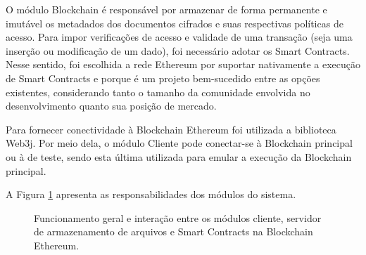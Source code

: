 \documentclass[a4paper,11pt]{article}
\begin{document}
O módulo Blockchain é responsável por armazenar de forma permanente e imutável {\color{blue}os metadados} dos documentos cifrados e suas respectivas políticas de acesso. Para impor verificações de acesso e validade de uma transação (seja uma inserção ou modificação de um dado), foi necessário adotar os Smart Contracts. %
Nesse sentido, foi escolhida a rede Ethereum por suportar nativamente a execução de Smart Contracts e porque é um projeto bem-sucedido entre as opções existentes, considerando tanto o tamanho da comunidade envolvida no desenvolvimento quanto sua posição de mercado. %

Para fornecer conectividade à Blockchain Ethereum foi utilizada a biblioteca Web3j.
Por meio dela, o módulo Cliente pode conectar-se à Blockchain principal ou à de teste, sendo esta última utilizada para emular a execução da Blockchain principal. %


A Figura \ref{fig:diagramaDCPABE} apresenta as responsabilidades dos módulos do sistema.

\begin{figure}[H]
  \centering
  
  \caption{Funcionamento geral e interação entre os módulos cliente, servidor de armazenamento de arquivos e Smart Contracts na Blockchain Ethereum.}
  \label{fig:diagramaDCPABE}
\end{figure}

\end{document}
